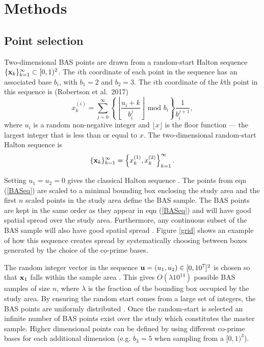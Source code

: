 \documentclass[titlepage]{article}
\begin{document}
\section{Methods}
\subsection{Point selection}

Two-dimensional BAS points are drawn from a random-start Halton sequence $\{{\bf x}_k\}_{k=1}^{\infty} \subset [0,1)^2$. The $i$th coordinate of each point in the sequence has an associated base $b_i$, with $b_1 = 2$ and $b_2 = 3$. The $i$th coordinate of the $k$th point in this sequence is (Robertson et al.\ 2017)
$$
x_k^{(i)} = \sum_{j = 0}^{\infty} \left\{\left\lfloor \frac{u_i + k}{b_i^j} \right\rfloor \text{ mod } b_i \right\}\frac{1}{b_i^{j+1}},
$$
where $u_i$ is a random non-negative integer and $\lfloor x \rfloor$ is the floor function --- the largest integer that is less than or equal to $x$. The two-dimensional random-start Halton sequence is 
\begin{equation}\label{BASeq}
\{{\bf x}_k\}_{k=1}^{\infty} = \left\{x_k^{(1)}, x_k^{(2)}\right\}_{k=1}^{\infty}.
\end{equation}

Setting $u_1 = u_2 = 0$ gives the classical Halton sequence \citep{Halton1960}. The points from eqn (\ref{BASeq}) are scaled to a minimal bounding box enclosing the study area and the first $n$ scaled points in the study area define the BAS sample. The BAS points are kept in the same order as they appear in eqn (\ref{BASeq}) and will have good spatial spread over the study area. Furthermore, any continuous subset of the BAS sample will also have good spatial spread \citep{Robertson2017}. Figure \ref{grid} shows an example of how this sequence creates spread by systematically choosing between boxes generated by the choice of the co-prime bases.

The random integer vector in the sequence ${\bf u} = (u_1, u_2) \in [0,10^7]^2$ is chosen so that ${\bf x}_1$ falls within the sample area \citep{Robertson2017}. This gives $O(\lambda 10^{14})$ possible BAS samples of size $n$, where $\lambda$ is the fraction of the bounding box occupied by the study area. By ensuring the random start comes from a large set of integers, the BAS points are uniformly distributed \citep{Robertson2013}. Once the random-start is selected an infinite number of BAS points exist over the study which constitutes the master sample. Higher dimensional points can be defined by using different co-prime bases for each additional dimension (e.g. $b_3 = 5$ when sampling from a $[0,1)^3$).
\end{document}
